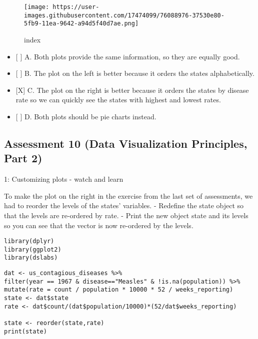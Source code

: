 \documentclass[]{article}
\providecommand{\tightlist}{%
  \setlength{\itemsep}{0pt}\setlength{\parskip}{0pt}}
\begin{document}
\begin{figure}
\centering
\texttt{[image: https://user-images.githubusercontent.com/17474099/76088976-37530e80-5fb9-11ea-9642-a94d5f40d7ae.png]}
\caption{index}
\end{figure}

\begin{itemize}
\tightlist
\item
  {[} {]} A. Both plots provide the same information, so they are
  equally good.
\item
  {[} {]} B. The plot on the left is better because it orders the states
  alphabetically.
\item
  {[}X{]} C. The plot on the right is better because it orders the
  states by disease rate so we can quickly see the states with highest
  and lowest rates.
\item
  {[} {]} D. Both plots should be pie charts instead.
\end{itemize}

\hypertarget{assessment-10-data-visualization-principles-part-2}{%
\subsection{Assessment 10 (Data Visualization Principles, Part
2)}\label{assessment-10-data-visualization-principles-part-2}}

1: Customizing plots - watch and learn

To make the plot on the right in the exercise from the last set of
assessments, we had to reorder the levels of the states' variables. -
Redefine the state object so that the levels are re-ordered by rate. -
Print the new object state and its levels so you can see that the vector
is now re-ordered by the levels.

\begin{verbatim}
library(dplyr)
library(ggplot2)
library(dslabs)
\end{verbatim}

\begin{verbatim}
dat <- us_contagious_diseases %>%
filter(year == 1967 & disease=="Measles" & !is.na(population)) %>% mutate(rate = count / population * 10000 * 52 / weeks_reporting)
state <- dat$state 
rate <- dat$count/(dat$population/10000)*(52/dat$weeks_reporting)

state <- reorder(state,rate)
print(state)
\end{verbatim}
\end{document}
